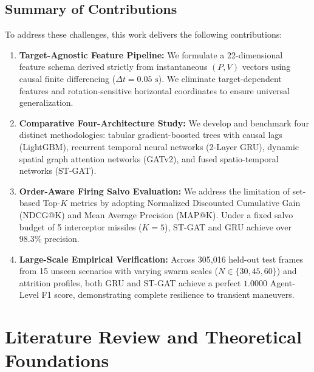 \documentclass[9pt]{ieeeconf}
\begin{document}
\subsection{Summary of Contributions}
To address these challenges, this work delivers the following contributions:
\begin{enumerate}
    \item \textbf{Target-Agnostic Feature Pipeline:} We formulate a 22-dimensional feature schema derived strictly from instantaneous $(P, V)$ vectors using causal finite differencing ($\Delta t = 0.05\text{ s}$). We eliminate target-dependent features and rotation-sensitive horizontal coordinates to ensure universal generalization.
    \item \textbf{Comparative Four-Architecture Study:} We develop and benchmark four distinct methodologies: tabular gradient-boosted trees with causal lags (LightGBM), recurrent temporal neural networks (2-Layer GRU), dynamic spatial graph attention networks (GATv2), and fused spatio-temporal networks (ST-GAT).
    \item \textbf{Order-Aware Firing Salvo Evaluation:} We address the limitation of set-based Top-$K$ metrics by adopting Normalized Discounted Cumulative Gain (NDCG@K) and Mean Average Precision (MAP@K). Under a fixed salvo budget of 5 interceptor missiles ($K=5$), ST-GAT and GRU achieve over $98.3\%$ precision.
    \item \textbf{Large-Scale Empirical Verification:} Across 305,016 held-out test frames from 15 unseen scenarios with varying swarm scales ($N \in \{30, 45, 60\}$) and attrition profiles, both GRU and ST-GAT achieve a perfect $1.0000$ Agent-Level F1 score, demonstrating complete resilience to transient maneuvers.
\end{enumerate}

\section{Literature Review and Theoretical Foundations}
\label{sec:literature}
\end{document}

